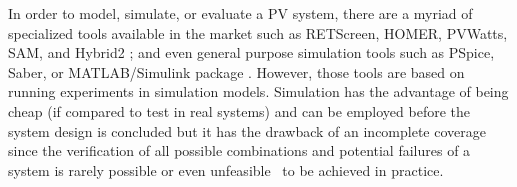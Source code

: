\documentclass[journal]{IEEEtran}
\begin{document}
In order to model, simulate, or evaluate a PV system, there are a myriad of specialized tools available in the market such as RETScreen, HOMER, PVWatts, SAM, and Hybrid2 \cite{Pradhan,Swarnkar,NRELDobos,NRELBlair,Mills}; and even general purpose simulation tools such as PSpice, Saber, or MATLAB/Simulink package \cite{Gow1999,Benatiallah2017}.
%
%
%
%
%
However, those tools are based on running experiments in simulation models. Simulation has the advantage of being cheap (if compared to test in real systems) and can be employed before the system design is concluded but it has the drawback of an incomplete coverage since the verification of all possible combinations and potential failures of a system is rarely possible or even unfeasible~\cite{ClarkeHV18} to be achieved in practice.
\end{document}
